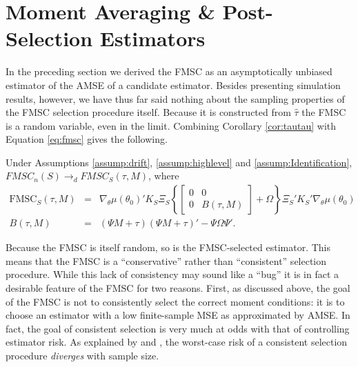\section{Moment Averaging \& Post-Selection Estimators}
\label{sec:avg}
In the preceding section we derived the FMSC as an asymptotically unbiased estimator of the AMSE of a candidate estimator.
Besides presenting simulation results, however, we have thus far said nothing about the sampling properties of the FMSC selection procedure itself.
Because it is constructed from $\widehat{\tau}$ the FMSC is a random variable, even in the limit.
Combining Corollary \ref{cor:tautau} with Equation \ref{eq:fmsc} gives the following.
\begin{cor}
\label{cor:FMSClimit}
	Under Assumptions \ref{assump:drift}, \ref{assump:highlevel} and \ref{assump:Identification}, $FMSC_n(S) \rightarrow_d FMSC_S(\tau, M)$, where
	\begin{eqnarray*}
		\mbox{FMSC}_S(\tau,M) &=& \nabla_\theta\mu(\theta_0)'K_S\Xi_S \left\{\left[\begin{array}{cc}0&0\\0& B(\tau,M) \end{array}\right] + \Omega\right\}\Xi_S'K_S'\nabla_\theta\mu(\theta_0)\\
		B(\tau,M) &=& (\Psi M + \tau)(\Psi M + \tau)' - \Psi \Omega \Psi'.
	\end{eqnarray*}
\end{cor}


Because the FMSC is itself random, so is the FMSC-selected estimator.
This means that the FMSC is a ``conservative'' rather than ``consistent'' selection procedure.
While this lack of consistency may sound like a ``bug'' it is in fact a desirable feature of the FMSC for two reasons.
First, as discussed above, the goal of the FMSC is not to consistently select the correct moment conditions: it is to choose an estimator with a low finite-sample MSE as approximated by AMSE.
In fact, the goal of consistent selection is very much at odds with that of controlling estimator risk.
As explained by \cite{Yang2005} and \cite{LeebPoetscher2008}, the worst-case risk of a consistent selection procedure \emph{diverges} with sample size. 

